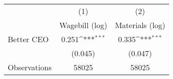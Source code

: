 {
\def\sym#1{\ifmmode^{#1}\else\(^{#1}\)\fi}
\begin{tabular}{l*{2}{c}}
\hline\hline
                    &\multicolumn{1}{c}{(1)}&\multicolumn{1}{c}{(2)}\\
                    &\multicolumn{1}{c}{Wagebill (log)}&\multicolumn{1}{c}{Materials (log)}\\
\hline
Better CEO          &       0.251\sym{***}&       0.335\sym{***}\\
                    &     (0.045)         &     (0.047)         \\
\hline
Observations        &       58025         &       58025         \\
\hline\hline
\end{tabular}
}
